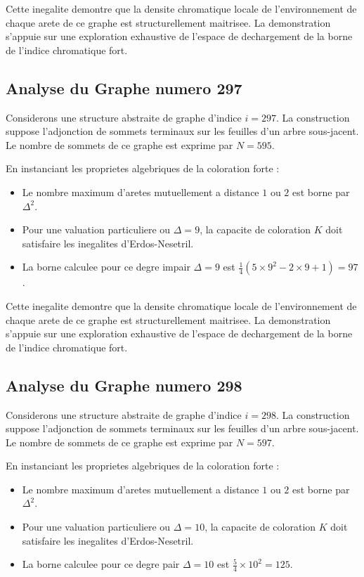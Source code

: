 \documentclass[11pt,a4paper]{article}
\begin{document}
Cette inegalite demontre que la densite chromatique locale de l'environnement de chaque arete de ce graphe est structurellement maitrisee. La demonstration s'appuie sur une exploration exhaustive de l'espace de dechargement de la borne de l'indice chromatique fort.

\subsection{Analyse du Graphe numero 297}
Considerons une structure abstraite de graphe d'indice $i = 297$. La construction suppose l'adjonction de sommets terminaux sur les feuilles d'un arbre sous-jacent. Le nombre de sommets de ce graphe est exprime par $N = 595$.

En instanciant les proprietes algebriques de la coloration forte :
\begin{itemize}
\item Le nombre maximum d'aretes mutuellement a distance $1$ ou $2$ est borne par $\Delta^2$.
\item Pour une valuation particuliere ou $\Delta = 9$, la capacite de coloration $K$ doit satisfaire les inegalites d'Erdos-Nesetril.
\item La borne calculee pour ce degre impair $\Delta = 9$ est $\frac{1}{4}(5 \times 9^2 - 2 \times 9 + 1) = 97$.
\end{itemize}

Cette inegalite demontre que la densite chromatique locale de l'environnement de chaque arete de ce graphe est structurellement maitrisee. La demonstration s'appuie sur une exploration exhaustive de l'espace de dechargement de la borne de l'indice chromatique fort.

\subsection{Analyse du Graphe numero 298}
Considerons une structure abstraite de graphe d'indice $i = 298$. La construction suppose l'adjonction de sommets terminaux sur les feuilles d'un arbre sous-jacent. Le nombre de sommets de ce graphe est exprime par $N = 597$.

En instanciant les proprietes algebriques de la coloration forte :
\begin{itemize}
\item Le nombre maximum d'aretes mutuellement a distance $1$ ou $2$ est borne par $\Delta^2$.
\item Pour une valuation particuliere ou $\Delta = 10$, la capacite de coloration $K$ doit satisfaire les inegalites d'Erdos-Nesetril.
\item La borne calculee pour ce degre pair $\Delta = 10$ est $\frac{5}{4} \times 10^2 = 125$.
\end{itemize}
\end{document}
